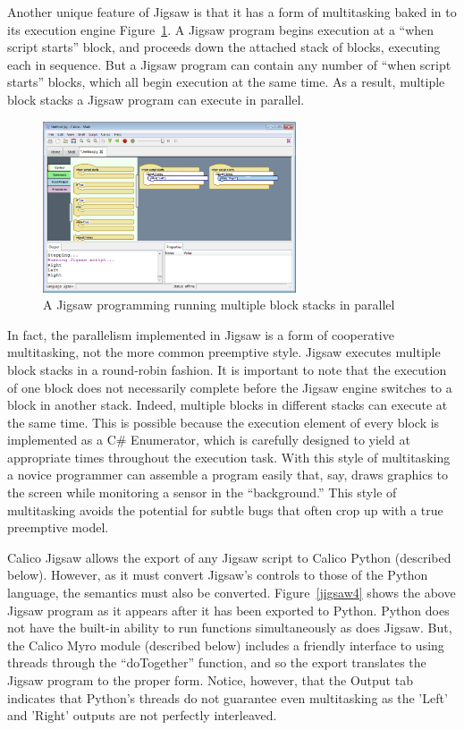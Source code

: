 \documentclass[preprint]{sigplanconf}
\begin{document}
Another unique feature of Jigsaw is that it has a form of multitasking
baked in to its execution engine Figure~\ref{jigsaw3}. A Jigsaw program begins
execution at a ``when script starts'' block, and proceeds down the
attached stack of blocks, executing each in sequence. But a Jigsaw
program can contain any number of ``when script starts'' blocks, which
all begin execution at the same time. As a result, multiple block
stacks a Jigsaw program can execute in parallel.

\begin{figure}[h!]
  \centering
    \includegraphics[width=75mm]{jigsaw3.eps} 
  \caption{A Jigsaw programming running multiple block stacks in parallel}
  \label{jigsaw3}
\end{figure}

In fact, the parallelism implemented in Jigsaw is a form of
cooperative multitasking, not the more common preemptive style. Jigsaw
executes multiple block stacks in a round-robin fashion. It is
important to note that the execution of one block does not necessarily
complete before the Jigsaw engine switches to a block in another
stack. Indeed, multiple blocks in different stacks can execute at the
same time. This is possible because the execution element of every
block is implemented as a C\# Enumerator, which is carefully designed
to yield at appropriate times throughout the execution task. With this
style of multitasking a novice programmer can assemble a program
easily that, say, draws graphics to the screen while monitoring a
sensor in the ``background.'' This style of multitasking avoids the
potential for subtle bugs that often crop up with a true preemptive
model.

Calico Jigsaw allows the export of any Jigsaw script to Calico Python
(described below). However, as it must convert Jigsaw's controls to
those of the Python language, the semantics must also be
converted. Figure~\ref{jigsaw4} shows the above Jigsaw program as it
appears after it has been exported to Python. Python does not have the
built-in ability to run functions simultaneously as does Jigsaw. But,
the Calico Myro module (described below) includes a friendly interface
to using threads through the ``doTogether'' function, and so the
export translates the Jigsaw program to the proper form. Notice,
however, that the Output tab indicates that Python's threads do not
guarantee even multitasking as the 'Left' and 'Right' outputs are not
perfectly interleaved.
\end{document}

